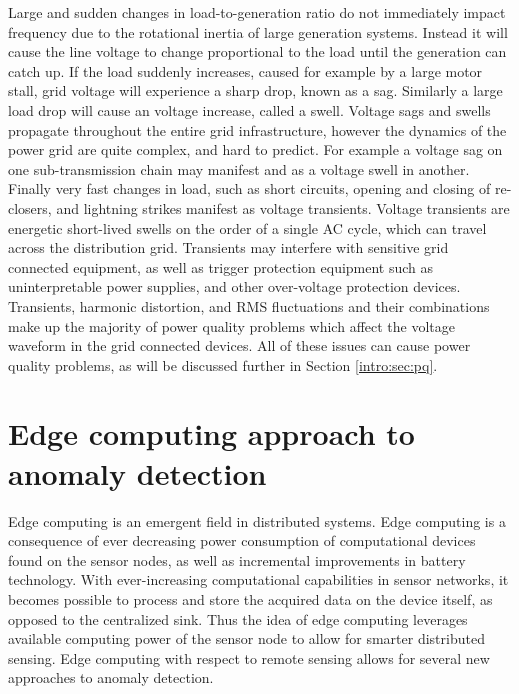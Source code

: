 Large and sudden changes in load-to-generation ratio do not immediately impact frequency due to the rotational inertia of large generation systems.
Instead it will cause the line voltage to change proportional to the load until the generation can catch up.
If the load suddenly increases, caused for example by a large motor stall, grid voltage will experience a sharp drop, known as a sag.
Similarly a large load drop will cause an voltage increase, called a swell.
Voltage sags and swells propagate throughout the entire grid infrastructure, however the dynamics of the power grid are quite complex, and hard to predict.
For example a voltage sag on one sub-transmission chain may manifest and as a voltage swell in another.\cite{kahle2016power}
Finally very fast changes in load, such as short circuits, opening and closing of re-closers, and lightning strikes manifest as voltage transients.
Voltage transients are energetic short-lived swells on the order of a single AC cycle, which can travel across the distribution grid.
Transients may interfere with sensitive grid connected equipment, as well as trigger protection equipment such as uninterpretable power supplies, and other over-voltage protection devices.
Transients, harmonic distortion, and RMS fluctuations and their combinations make up the majority of power quality problems which affect the voltage waveform in the grid connected devices. \cite{5154067} All of these issues can cause power quality problems, as will be discussed further in Section \ref{intro:sec:pq}.

\section{Edge computing approach to anomaly detection}\label{intro:edge}
Edge computing is an emergent field in distributed systems.
Edge computing is a consequence of ever decreasing power consumption of computational devices found on the sensor nodes, as well as incremental improvements in battery technology.
With ever-increasing computational capabilities in sensor networks, it becomes possible to process and store the acquired data on the device itself, as opposed to the centralized sink.
Thus the idea of edge computing leverages available computing power of the sensor node to allow for smarter distributed sensing.
Edge computing with respect to remote sensing allows for several new approaches to anomaly detection.


